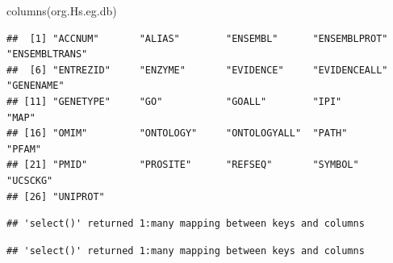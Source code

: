 \documentclass[
]{article}
\newenvironment{Shaded}{\begin{snugshade}}{\end{snugshade}}
\newcommand{\AttributeTok}[1]{\textcolor[rgb]{0.77,0.63,0.00}{#1}}
\newcommand{\FunctionTok}[1]{\textcolor[rgb]{0.00,0.00,0.00}{#1}}
\newcommand{\NormalTok}[1]{#1}
\newcommand{\OtherTok}[1]{\textcolor[rgb]{0.56,0.35,0.01}{#1}}
\newcommand{\SpecialCharTok}[1]{\textcolor[rgb]{0.00,0.00,0.00}{#1}}
\newcommand{\StringTok}[1]{\textcolor[rgb]{0.31,0.60,0.02}{#1}}
\begin{document}
\begin{Shaded}
\begin{Highlighting}[]
\FunctionTok{columns}\NormalTok{(org.Hs.eg.db)}
\end{Highlighting}
\end{Shaded}

\begin{verbatim}
##  [1] "ACCNUM"       "ALIAS"        "ENSEMBL"      "ENSEMBLPROT"  "ENSEMBLTRANS"
##  [6] "ENTREZID"     "ENZYME"       "EVIDENCE"     "EVIDENCEALL"  "GENENAME"    
## [11] "GENETYPE"     "GO"           "GOALL"        "IPI"          "MAP"         
## [16] "OMIM"         "ONTOLOGY"     "ONTOLOGYALL"  "PATH"         "PFAM"        
## [21] "PMID"         "PROSITE"      "REFSEQ"       "SYMBOL"       "UCSCKG"      
## [26] "UNIPROT"
\end{verbatim}

\begin{Shaded}
\end{Shaded}

\begin{verbatim}
## 'select()' returned 1:many mapping between keys and columns
\end{verbatim}

\begin{Shaded}
\end{Shaded}

\begin{verbatim}
## 'select()' returned 1:many mapping between keys and columns
\end{verbatim}
\end{document}

